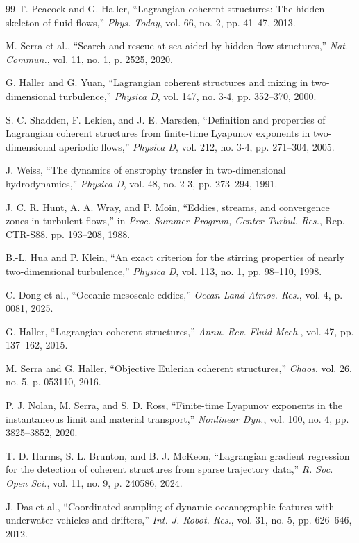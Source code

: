 \documentclass[lettersize,journal]{IEEEtran}
\begin{document}
\begin{thebibliography}{99}
 T. Peacock and G. Haller, ``Lagrangian coherent structures: The
hidden skeleton of fluid flows,'' \textit{Phys. Today}, vol. 66, no. 2,
pp. 41--47, 2013.

 M. Serra et al., ``Search and rescue at sea aided by hidden flow
structures,'' \textit{Nat. Commun.}, vol. 11, no. 1, p. 2525, 2020.

 G. Haller and G. Yuan, ``Lagrangian coherent structures and mixing
in two-dimensional turbulence,'' \textit{Physica D}, vol. 147, no. 3-4,
pp. 352--370, 2000.

 S. C. Shadden, F. Lekien, and J. E. Marsden, ``Definition and
properties of Lagrangian coherent structures from finite-time Lyapunov
exponents in two-dimensional aperiodic flows,'' \textit{Physica D}, vol. 212,
no. 3-4, pp. 271--304, 2005.

 J. Weiss, ``The dynamics of enstrophy transfer in two-dimensional
hydrodynamics,'' \textit{Physica D}, vol. 48, no. 2-3, pp. 273--294, 1991.

 J. C. R. Hunt, A. A. Wray, and P. Moin, ``Eddies, streams, and
convergence zones in turbulent flows,'' in \textit{Proc. Summer Program,
Center Turbul. Res.}, Rep. CTR-S88, pp. 193--208, 1988.

 B.-L. Hua and P. Klein, ``An exact criterion for the stirring
properties of nearly two-dimensional turbulence,'' \textit{Physica D}, vol. 113,
no. 1, pp. 98--110, 1998.

 C. Dong et al., ``Oceanic mesoscale eddies,''
\textit{Ocean-Land-Atmos. Res.}, vol. 4, p. 0081, 2025.

 G. Haller, ``Lagrangian coherent structures,'' \textit{Annu. Rev.
Fluid Mech.}, vol. 47, pp. 137--162, 2015.

 M. Serra and G. Haller, ``Objective Eulerian coherent
structures,'' \textit{Chaos}, vol. 26, no. 5, p. 053110, 2016.

 P. J. Nolan, M. Serra, and S. D. Ross, ``Finite-time Lyapunov
exponents in the instantaneous limit and material transport,''
\textit{Nonlinear Dyn.}, vol. 100, no. 4, pp. 3825--3852, 2020.

 T. D. Harms, S. L. Brunton, and B. J. McKeon, ``Lagrangian
gradient regression for the detection of coherent structures from sparse
trajectory data,'' \textit{R. Soc. Open Sci.}, vol. 11, no. 9,
p. 240586, 2024.

 J. Das et al., ``Coordinated sampling of dynamic oceanographic
features with underwater vehicles and drifters,'' \textit{Int. J. Robot.
Res.}, vol. 31, no. 5, pp. 626--646, 2012.


\end{thebibliography}
\end{document}
